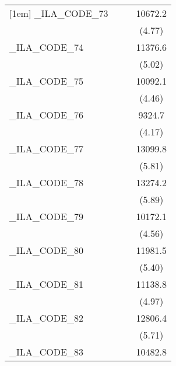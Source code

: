 {\begin{tabular}{l*{3}{c}}
[1em]
\_ILA\_CODE\_73&                     &                     &     10672.2\sym{***}\\
            &                     &                     &      (4.77)         \\
[1em]
\_ILA\_CODE\_74&                     &                     &     11376.6\sym{***}\\
            &                     &                     &      (5.02)         \\
[1em]
\_ILA\_CODE\_75&                     &                     &     10092.1\sym{***}\\
            &                     &                     &      (4.46)         \\
[1em]
\_ILA\_CODE\_76&                     &                     &      9324.7\sym{***}\\
            &                     &                     &      (4.17)         \\
[1em]
\_ILA\_CODE\_77&                     &                     &     13099.8\sym{***}\\
            &                     &                     &      (5.81)         \\
[1em]
\_ILA\_CODE\_78&                     &                     &     13274.2\sym{***}\\
            &                     &                     &      (5.89)         \\
[1em]
\_ILA\_CODE\_79&                     &                     &     10172.1\sym{***}\\
            &                     &                     &      (4.56)         \\
[1em]
\_ILA\_CODE\_80&                     &                     &     11981.5\sym{***}\\
            &                     &                     &      (5.40)         \\
[1em]
\_ILA\_CODE\_81&                     &                     &     11138.8\sym{***}\\
            &                     &                     &      (4.97)         \\
[1em]
\_ILA\_CODE\_82&                     &                     &     12806.4\sym{***}\\
            &                     &                     &      (5.71)         \\
[1em]
\_ILA\_CODE\_83&                     &                     &     10482.8\sym{***}\\

\end{tabular}}
